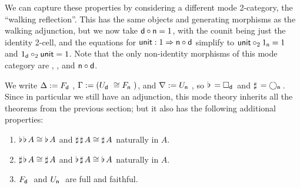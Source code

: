 \documentclass{drl-common/llncs}
\newcommand{\tc}[2]{\ensuremath{#1 \Rightarrow #2}}
\newcommand\compo[2]{\ensuremath{#1 \circ #2}}
\newcommand\comph[2]{\ensuremath{#1 \mathbin{\circ_2} #2}}
\newcommand\F[2]{\ensuremath{F_{#1} \,\, #2}}
\newcommand\U[2]{\ensuremath{U_{#1} \,\, #2}}
\newcommand\Bx[2]{\ensuremath{\Box_{#1} \, {#2}}}
\newcommand\Crc[2]{\ensuremath{\bigcirc_{#1} \, {#2}}}
\newcommand\Flat[1]{\ensuremath{\flat \, {#1}}}
\newcommand\Sharp[1]{\ensuremath{\sharp \, {#1}}}
\begin{document}
We can capture these properties by considering a different mode
2-category, the ``walking reflection''.  This has the same objects and generating
morphisms as the walking adjunction, but we now take $\compo{\dsd d}{\dsd n} = 1$, with
the counit being just the identity 2-cell, and the equations for
$\dsd{unit} : \tc {1} {\compo{\dsd n}{\dsd d}}$ simplify to
$\comph{\dsd{unit}}{1_{\dsd n}} = 1$ and $\comph{1_{\dsd d}}{\dsd{unit}}
= 1$.  Note that the only non-identity morphisms of this mode category
are , , and \compo{\dsd{n}}{\dsd{d}}.  

We write $\Delta := \F{\dsd{d}}{}$, $\Gamma := (\U{\dsd d}{} \iso
\F{\dsd n}{})$, and $\nabla := \U{\dsd{n}}{}$, so $\Flat{} =
\Bx{\dsd{d}}{}$ and $\Sharp{} = \Crc{\dsd{n}}{}$.  Since in particular
we still have an adjunction, this mode theory inherits all the theorems
from the previous section; but it also has the following additional
properties:

\begin{theorem}
\begin{enumerate}
\item $\Flat{\Flat A} \iso \Flat A$ and $\Sharp{\Sharp A} \iso \Sharp A$
  naturally in $A$.
\item $\Sharp{\Flat A} \iso \Sharp{A}$ 
and $\Flat{\Sharp A} \iso \Flat{A}$ naturally in $A$.
\item \F{\dsd{d}}{} and \U{\dsd{n}}{} are full and faithful.
\end{enumerate}
\end{theorem}
\end{document}
